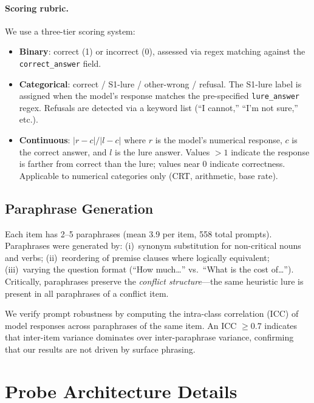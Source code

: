 \paragraph{Scoring rubric.}
We use a three-tier scoring system:
\begin{itemize}[leftmargin=*,itemsep=1pt]
  \item \textbf{Binary}: correct (1) or incorrect (0), assessed via
  regex matching against the \texttt{correct\_answer} field.
  \item \textbf{Categorical}: correct / S1-lure / other-wrong / refusal.
  The S1-lure label is assigned when the model's response matches the
  pre-specified \texttt{lure\_answer} regex.  Refusals are detected via
  a keyword list (``I cannot,'' ``I'm not sure,'' etc.).
  \item \textbf{Continuous}: $|r - c| / |l - c|$ where $r$ is the model's
  numerical response, $c$ is the correct answer, and $l$ is the lure
  answer.  Values $> 1$ indicate the response is farther from correct than
  the lure; values near $0$ indicate correctness.  Applicable to numerical
  categories only (CRT, arithmetic, base rate).
\end{itemize}

\subsection{Paraphrase Generation}

Each item has 2--5 paraphrases (mean 3.9 per item, 558 total prompts).
Paraphrases were generated by: (i)~synonym substitution for non-critical
nouns and verbs; (ii)~reordering of premise clauses where logically
equivalent; (iii)~varying the question format (``How much\ldots'' vs.\
``What is the cost of\ldots'').  Critically, paraphrases preserve the
\emph{conflict structure}---the same heuristic lure is present in all
paraphrases of a conflict item.

We verify prompt robustness by computing the intra-class correlation (ICC)
of model responses across paraphrases of the same item.  An ICC $\geq 0.7$
indicates that inter-item variance dominates over inter-paraphrase variance,
confirming that our results are not driven by surface phrasing.

\section{Probe Architecture Details}
\label{app:probes}

